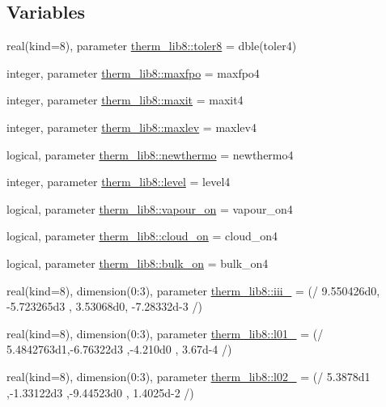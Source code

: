 \subsection*{Variables}
\begin{DoxyCompactItemize}
\item 
real(kind=8), parameter \hyperlink{namespacetherm__lib8_a8b637ec830ea211fe50a2365a9a5d1e2}{therm\+\_\+lib8\+::toler8} = dble(toler4)
\item 
integer, parameter \hyperlink{namespacetherm__lib8_ae43667eb586a48e36ec5508be0a58153}{therm\+\_\+lib8\+::maxfpo} = maxfpo4
\item 
integer, parameter \hyperlink{namespacetherm__lib8_a1fff65e6f008a88c6c8ebecbc85f518c}{therm\+\_\+lib8\+::maxit} = maxit4
\item 
integer, parameter \hyperlink{namespacetherm__lib8_a8608aff039402524592e0c7b6cdeac27}{therm\+\_\+lib8\+::maxlev} = maxlev4
\item 
logical, parameter \hyperlink{namespacetherm__lib8_acf7c73667b035fd1eb6ab1d3924e941e}{therm\+\_\+lib8\+::newthermo} = newthermo4
\item 
integer, parameter \hyperlink{namespacetherm__lib8_a5aa70fb6d66e28229c98896efb7d03d9}{therm\+\_\+lib8\+::level} = level4
\item 
logical, parameter \hyperlink{namespacetherm__lib8_a8dcf3ae8ee8dc104aaded77571f2be33}{therm\+\_\+lib8\+::vapour\+\_\+on} = vapour\+\_\+on4
\item 
logical, parameter \hyperlink{namespacetherm__lib8_a826524c63660fd35bee5d07fa43c19e0}{therm\+\_\+lib8\+::cloud\+\_\+on} = cloud\+\_\+on4
\item 
logical, parameter \hyperlink{namespacetherm__lib8_aa2d5118204fcd26e0603d47b2bd1a48c}{therm\+\_\+lib8\+::bulk\+\_\+on} = bulk\+\_\+on4
\item 
real(kind=8), dimension(0\+:3), parameter \hyperlink{namespacetherm__lib8_ae4acd61a7c0e6a8e640771554e879769}{therm\+\_\+lib8\+::iii\+\_} = (/ 9.\+550426d0, -\/5.\+723265d3 , 3.\+53068d0, -\/7.\+28332d-\/3 /)
\item 
real(kind=8), dimension(0\+:3), parameter \hyperlink{namespacetherm__lib8_a2874cfd6a2661d95f8a2b827ebbd1d5d}{therm\+\_\+lib8\+::l01\+\_} = (/ 5.\+4842763d1,-\/6.\+76322d3 ,-\/4.\+210d0 , 3.\+67d-\/4 /)
\item 
real(kind=8), dimension(0\+:3), parameter \hyperlink{namespacetherm__lib8_ab6c640a78c761844912d94aac7c317b8}{therm\+\_\+lib8\+::l02\+\_} = (/ 5.\+3878d1 ,-\/1.\+33122d3 ,-\/9.\+44523d0 , 1.\+4025d-\/2 /)

\end{DoxyCompactItemize}
